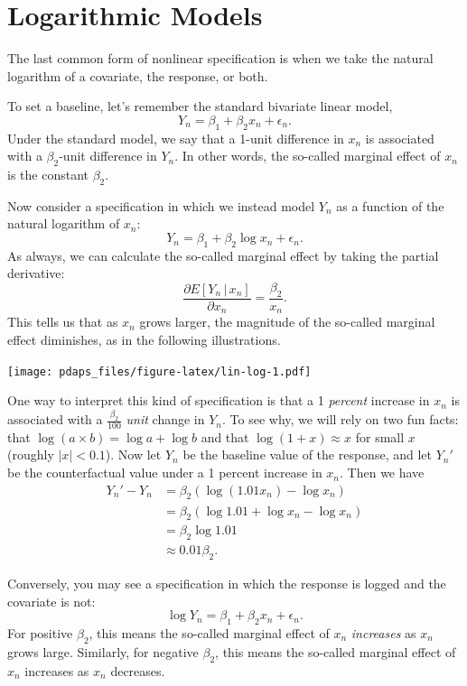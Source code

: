\documentclass[
  12pt,
  oneside,openany]{book}
\begin{document}
\hypertarget{logarithmic-models}{%
\section{Logarithmic Models}\label{logarithmic-models}}

The last common form of nonlinear specification is when we take the natural logarithm of a covariate, the response, or both.

To set a baseline, let's remember the standard bivariate linear model,
\[
Y_n = \beta_1 + \beta_2 x_n + \epsilon_n.
\]
Under the standard model, we say that a 1-unit difference in \(x_n\) is associated with a \(\beta_2\)-unit difference in \(Y_n\).
In other words, the so-called marginal effect of \(x_n\) is the constant \(\beta_2\).

Now consider a specification in which we instead model \(Y_n\) as a function of the natural logarithm of \(x_n\):
\[
Y_n = \beta_1 + \beta_2 \log x_n + \epsilon_n.
\]
As always, we can calculate the so-called marginal effect by taking the partial derivative:
\[
\frac{\partial{}E[Y_n \,|\, x_n]}{\partial{}x_n} = \frac{\beta_2}{x_n}.
\]
This tells us that as \(x_n\) grows larger, the magnitude of the so-called marginal effect diminishes, as in the following illustrations.

\texttt{[image: pdaps\_files/figure-latex/lin-log-1.pdf]}

One way to interpret this kind of specification is that a 1 \emph{percent} increase in \(x_n\) is associated with a \(\frac{\beta_2}{100}\) \emph{unit} change in \(Y_n\).
To see why, we will rely on two fun facts: that \(\log(a \times b) = \log a + \log b\) and that \(\log(1 + x) \approx x\) for small \(x\) (roughly \(|x| < 0.1\)).
Now let \(Y_n\) be the baseline value of the response, and let \(Y_n'\) be the counterfactual value under a 1 percent increase in \(x_n\).
Then we have
\[
\begin{aligned}
Y_n' - Y_n
&= \beta_2 (\log(1.01 x_n) - \log x_n) \\
&= \beta_2 (\log 1.01 + \log x_n - \log x_n) \\
&= \beta_2 \log 1.01 \\
&\approx 0.01 \beta_2.
\end{aligned}
\]

Conversely, you may see a specification in which the response is logged and the covariate is not:
\[
\log Y_n = \beta_1 + \beta_2 x_n + \epsilon_n.
\]
For positive \(\beta_2\), this means the so-called marginal effect of \(x_n\) \emph{increases} as \(x_n\) grows large.
Similarly, for negative \(\beta_2\), this means the so-called marginal effect of \(x_n\) increases as \(x_n\) decreases.
\end{document}
